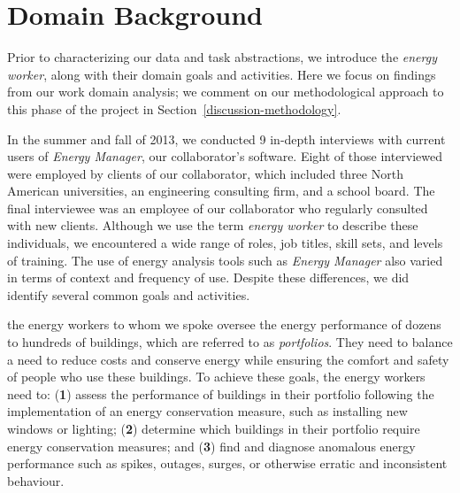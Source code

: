 \documentclass[journal]{vgtc}                %
\newcommand{\bstart}[1]{\vspace{1mm} \noindent{\textbf{#1:}}}
\begin{document}

\section{Domain Background}
\label{domain}


Prior to characterizing our data and task abstractions, we introduce the {\it energy worker}, along with their domain goals and activities.
Here we focus on findings from our work domain analysis; we comment on our methodological approach to this phase of the project in Section~\ref{discussion-methodology}. 

In the summer and fall of 2013, we conducted 9 in-depth interviews with current users of {\it Energy Manager}, our collaborator's software.
Eight of those interviewed were employed by clients of our collaborator, which included three North American universities, an engineering consulting firm, and a school board. 
The final interviewee was an employee of our collaborator who regularly consulted with new clients.  
Although we use the term {\it energy worker} to describe these individuals, we encountered a wide range of roles, job titles, skill sets, and levels of training. 
The use of energy analysis tools such as {\it Energy Manager} also varied in terms of context and frequency of use.
Despite these differences, we did identify several common goals and activities.

\bstart{Domain goals and activities} the energy workers to whom we spoke oversee the energy performance of dozens to hundreds of buildings, which are referred to as {\it portfolios}. 
They need to balance a need to reduce costs and conserve energy while ensuring the comfort and safety of people who use these buildings.
To achieve these goals, the energy workers need to: ({\bf 1}) assess the performance of buildings in their portfolio following the implementation of an energy conservation measure, such as installing new windows or lighting; ({\bf 2}) determine which buildings in their portfolio require energy conservation measures; and ({\bf 3}) find and diagnose anomalous energy performance such as spikes, outages, surges, or otherwise erratic and inconsistent behaviour.
\end{document}
